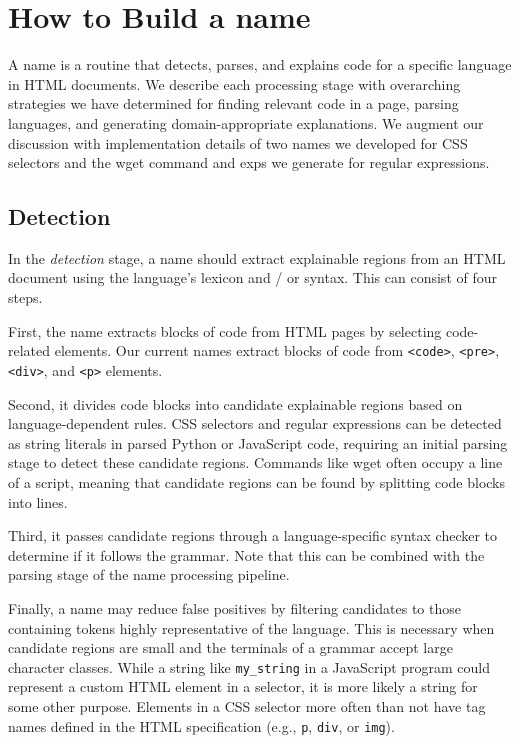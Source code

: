 \section{How to Build a \Gls{name}}

A \Gls{name} is a routine that detects, parses, and explains code for a specific language in HTML documents.
We describe each processing stage with overarching strategies we have determined for finding relevant code in a page, parsing languages, and generating domain-appropriate explanations.
We augment our discussion with implementation details of two \Glspl{name} we developed for CSS selectors and the wget command and \glspl{exp} we generate for regular expressions.

\subsection{Detection}
In the \emph{detection} stage, a \Gls{name} should extract explainable regions from an HTML document using the language's lexicon and / or syntax.
This can consist of four steps.

First, the \Gls{name} extracts blocks of code from HTML pages by selecting code-related elements.
Our current \Glspl{name} extract blocks of code from \texttt{<code>}, \texttt{<pre>}, \texttt{<div>}, and \texttt{<p>} elements.

Second, it divides code blocks into candidate explainable regions based on language-dependent rules.
CSS selectors and regular expressions can be detected as string literals in parsed Python or JavaScript code, requiring an initial parsing stage to detect these candidate regions.
Commands like wget often occupy a line of a script, meaning that candidate regions can be found by splitting code blocks into lines.

Third, it passes candidate regions through a language-specific syntax checker to determine if it follows the grammar.
Note that this can be combined with the parsing stage of the \Gls{name} processing pipeline.

Finally, a \Gls{name} may reduce false positives by filtering candidates to those containing tokens highly representative of the language.
This is necessary when candidate regions are small and the terminals of a grammar accept large character classes.
While a string like \texttt{\qs{}my\_string\qs{}} in a JavaScript program could represent a custom HTML element in a selector, it is more likely a string for some other purpose.
Elements in a CSS selector more often than not have tag names defined in the HTML specification (e.g., \texttt{p}, \texttt{div}, or \texttt{img}).


